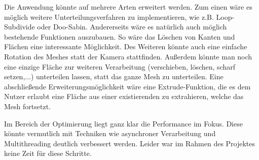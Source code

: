 Die Anwendung könnte auf mehrere Arten erweitert werden.
Zum einen wäre es möglich weitere Unterteilungsverfahren zu implementieren, wie z.B. Loop-Subdivide oder Doo-Sabin.
Andererseits wäre es natürlich auch möglich bestehende Funktionen auszubauen. 
So wäre das Löschen von Kanten und Flächen eine interessante Möglichkeit.
Des Weiteren könnte auch eine einfache Rotation des Meshes statt der Kamera stattfinden.
Au\ss{}erdem könnte man noch eine einzige Fläche zur weiteren Verarbeitung (verschieben, löschen, scharf setzen,...) unterteilen lassen, statt das ganze Mesh zu unterteilen.
Eine abschlie\ss{}ende Erweiterungsmöglichkeit wäre eine Extrude-Funktion, die es dem Nutzer erlaubt eine Fläche aus einer existierenden zu extrahieren, welche das Mesh fortsetzt.

Im Bereich der Optimierung liegt ganz klar die Performance im Fokus. 
Diese könnte vermutlich mit Techniken wie asynchroner Verarbeitung und Multithreading deutlich verbessert werden.
Leider war im Rahmen des Projektes keine Zeit für diese Schritte.
